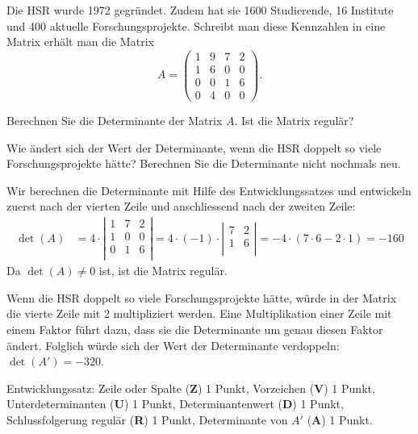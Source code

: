 Die HSR wurde 1972 gegründet. Zudem hat sie 1600 Studierende, 16 Institute und 400
aktuelle Forschungsprojekte. Schreibt man diese Kennzahlen in eine Matrix erhält man
die Matrix
\[
A=
\begin{pmatrix}
 1 & 9 & 7 & 2\\
 1 & 6 & 0 & 0\\
 0 & 0 & 1 & 6\\
 0 & 4 & 0 & 0
\end{pmatrix}.
\]
\begin{teilaufgaben}
\item 
Berechnen Sie die Determinante der Matrix $A$. Ist die Matrix regulär?
\item Wie ändert sich der Wert der Determinante, wenn die HSR doppelt so viele 
Forschungsprojekte hätte? Berechnen Sie die Determinante nicht nochmals neu.
\end{teilaufgaben}


\begin{loesung}
\begin{teilaufgaben}
\item
Wir berechnen die Determinante mit Hilfe des Entwicklungssatzes 
und entwickeln zuerst nach der vierten Zeile und anschliessend nach 
der zweiten Zeile:
\begin{align*}
\det(A)
&=
4\cdot\left|
\begin{matrix}
 1 & 7 & 2\\
 1 & 0 & 0\\
 0 & 1 & 6\\
\end{matrix}
\right|
= 
4\cdot(-1)\cdot\left|
\begin{matrix}
 7 & 2\\
 1 & 6\\
\end{matrix}
\right|
= 
-4\cdot (7\cdot 6 - 2 \cdot 1)
= -160
\end{align*}
Da $\det(A)\neq 0$ ist, ist die Matrix regulär.
\item 
Wenn die HSR doppelt so viele Forschungsprojekte hätte, würde 
in der Matrix die vierte Zeile mit 2 multipliziert werden.
Eine Multiplikation einer Zeile mit einem Faktor führt dazu,
dass sie die Determinante um genau diesen Faktor ändert.
Folglich würde sich der Wert der Determinante verdoppeln: 
$\det(A') = -320$.
\end{teilaufgaben}
\end{loesung}

\begin{bewertung}
Entwicklungssatz: Zeile oder Spalte ({\bf Z}) 1 Punkt,
Vorzeichen ({\bf V}) 1 Punkt,
Unterdeterminanten ({\bf U}) 1 Punkt,
Determinantenwert ({\bf D}) 1 Punkt,
Schlussfolgerung regulär ({\bf R}) 1 Punkt,
Determinante von $A'$ ({\bf A}) 1 Punkt.
\end{bewertung}

